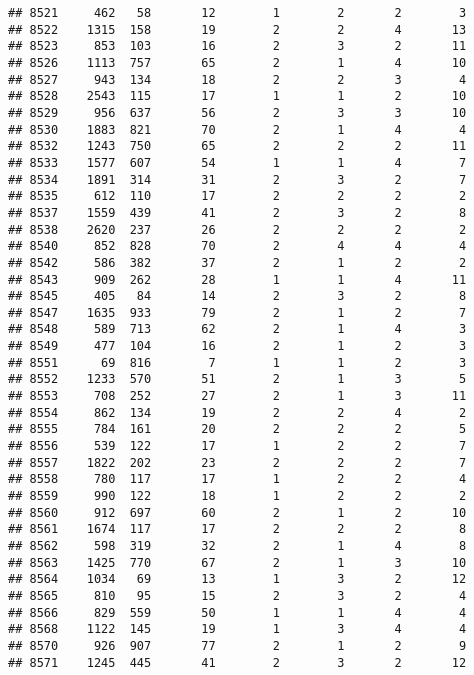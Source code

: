 \documentclass[]{article}
\begin{document}
\begin{verbatim}
## 8521     462   58       12        1        2       2        3
## 8522    1315  158       19        2        2       4       13
## 8523     853  103       16        2        3       2       11
## 8526    1113  757       65        2        1       4       10
## 8527     943  134       18        2        2       3        4
## 8528    2543  115       17        1        1       2       10
## 8529     956  637       56        2        3       3       10
## 8530    1883  821       70        2        1       4        4
## 8532    1243  750       65        2        2       2       11
## 8533    1577  607       54        1        1       4        7
## 8534    1891  314       31        2        3       2        7
## 8535     612  110       17        2        2       2        2
## 8537    1559  439       41        2        3       2        8
## 8538    2620  237       26        2        2       2        2
## 8540     852  828       70        2        4       4        4
## 8542     586  382       37        2        1       2        2
## 8543     909  262       28        1        1       4       11
## 8545     405   84       14        2        3       2        8
## 8547    1635  933       79        2        1       2        7
## 8548     589  713       62        2        1       4        3
## 8549     477  104       16        2        1       2        3
## 8551      69  816        7        1        1       2        3
## 8552    1233  570       51        2        1       3        5
## 8553     708  252       27        2        1       3       11
## 8554     862  134       19        2        2       4        2
## 8555     784  161       20        2        2       2        5
## 8556     539  122       17        1        2       2        7
## 8557    1822  202       23        2        2       2        7
## 8558     780  117       17        1        2       2        4
## 8559     990  122       18        1        2       2        2
## 8560     912  697       60        2        1       2       10
## 8561    1674  117       17        2        2       2        8
## 8562     598  319       32        2        1       4        8
## 8563    1425  770       67        2        1       3       10
## 8564    1034   69       13        1        3       2       12
## 8565     810   95       15        2        3       2        4
## 8566     829  559       50        1        1       4        4
## 8568    1122  145       19        1        3       4        4
## 8570     926  907       77        2        1       2        9
## 8571    1245  445       41        2        3       2       12

\end{verbatim}
\end{document}
